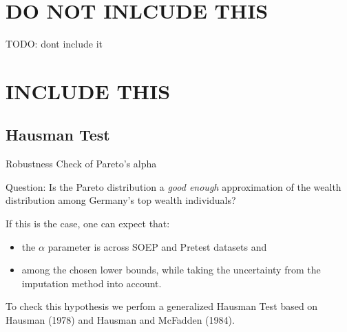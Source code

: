 \documentclass[ignorenonframetext,]{beamer}
\date{}
\providecommand{\tightlist}{%
  \setlength{\itemsep}{0pt}\setlength{\parskip}{0pt}}
\begin{document}
\hypertarget{do-not-inlcude-this}{%
\section{DO NOT INLCUDE THIS}\label{do-not-inlcude-this}}

TODO: dont include it

\hypertarget{include-this}{%
\section{INCLUDE THIS}\label{include-this}}

\hypertarget{hausman-test}{%
\subsection{Hausman Test}\label{hausman-test}}

\begin{frame}[allowframebreaks]{Robustness Check of Pareto's alpha}
\protect\hypertarget{robustness-check-of-paretos-alpha}{}

Question: Is the Pareto distribution a \emph{good enough} approximation
of the wealth distribution among Germany's top wealth individuals?

If this is the case, one can expect that:

\begin{itemize}
\tightlist
\item
  the \(\alpha\) parameter is across SOEP and Pretest datasets and
\item
  among the chosen lower bounds, while taking the uncertainty from the
  imputation method into account.
\end{itemize}

To check this hypothesis we perfom a generalized Hausman Test based on
Hausman (1978) and Hausman and McFadden (1984).

\end{frame}
\end{document}
